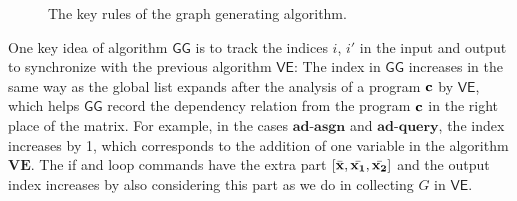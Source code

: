 {\begin{figure}
    \caption{The key rules of the graph generating algorithm.}
    \label{fig:algo_ad}
\end{figure}
}
%

One key idea of algorithm $\mathsf{GG}$ is to track the indices $i$, $i'$ in the input and output to synchronize with the previous algorithm $\mathsf{VE}$: The index in $\mathsf{GG}$ increases in the same way as the global list expands after the analysis of a program ${\bf{{c}}}$ by $\mathsf{VE}$, which helps $\mathsf{GG}$ record the dependency relation from the program ${\bf{{c}}}$ in the right place of the matrix. For example, in the cases $\textbf{ad-asgn}$ and $\textbf{ad-query}$, the index increases by 1, which corresponds to the addition of one variable in the algorithm $\textbf{VE}$. The if and loop commands have the extra part $[\bar{{\bf{{x}}}}, \bar{{\bf{{x_1}}}}, \bar{{\bf{{x_2}}}}] $ and the output index increases by also considering this part as we do in collecting $G$ in $\mathsf{VE}$.  

